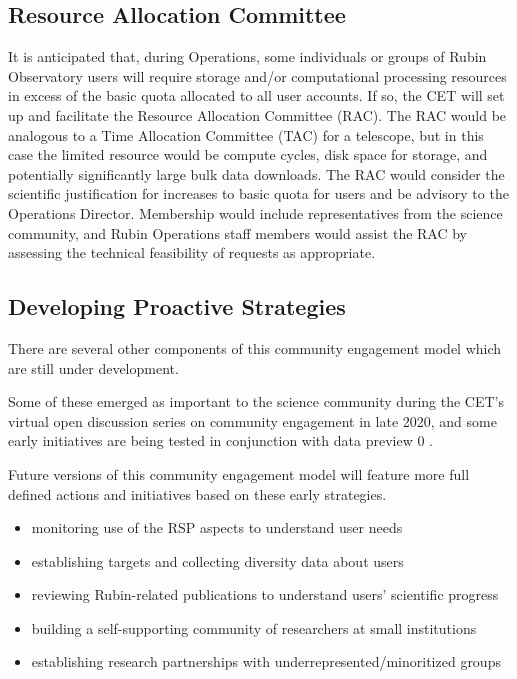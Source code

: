 \documentclass[DM,lsstdraft,toc]{lsstdoc}
\begin{document}
\subsection{Resource Allocation Committee}\label{ssec:mod_rac}

It is anticipated that, during Operations, some individuals or groups of Rubin Observatory users will require storage and/or computational processing resources in excess of the basic quota allocated to all user accounts.
If so, the CET will set up and facilitate the Resource Allocation Committee (RAC).
The RAC would be analogous to a Time Allocation Committee (TAC) for a telescope, but in this case the limited resource would be compute cycles, disk space for storage, and potentially significantly large bulk data downloads.
The RAC would consider the scientific justification for increases to basic quota for users and be advisory to the Operations Director.
Membership would include representatives from the science community, and Rubin Operations staff members would assist the RAC by assessing the technical feasibility of requests as appropriate.


\subsection{Developing Proactive Strategies}

There are several other components of this community engagement model which are still under development.

Some of these emerged as important to the science community during the CET's virtual open discussion series on community engagement in late 2020, and some early initiatives are being tested in conjunction with data preview 0 .

Future versions of this community engagement model will feature more full defined actions and initiatives based on these early strategies.
\begin{itemize}
\item monitoring use of the RSP aspects to understand user needs
\item establishing targets and collecting diversity data about users
\item reviewing Rubin-related publications to understand users' scientific progress
\item building a self-supporting community of researchers at small institutions
\item establishing research partnerships with underrepresented/minoritized groups
\end{itemize}
\end{document}
